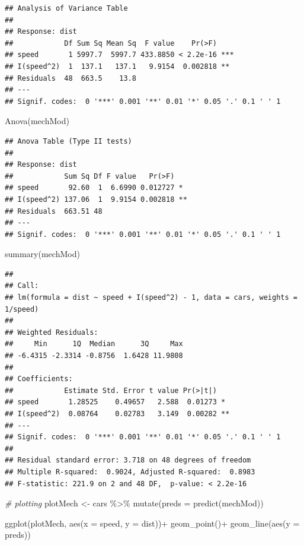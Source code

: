 \documentclass[
]{book}
\newenvironment{Shaded}{\begin{snugshade}}{\end{snugshade}}
\newcommand{\AttributeTok}[1]{\textcolor[rgb]{0.77,0.63,0.00}{#1}}
\newcommand{\CommentTok}[1]{\textcolor[rgb]{0.56,0.35,0.01}{\textit{#1}}}
\newcommand{\FunctionTok}[1]{\textcolor[rgb]{0.00,0.00,0.00}{#1}}
\newcommand{\NormalTok}[1]{#1}
\newcommand{\OtherTok}[1]{\textcolor[rgb]{0.56,0.35,0.01}{#1}}
\newcommand{\SpecialCharTok}[1]{\textcolor[rgb]{0.00,0.00,0.00}{#1}}
\begin{document}
\begin{verbatim}
## Analysis of Variance Table
## 
## Response: dist
##            Df Sum Sq Mean Sq  F value    Pr(>F)    
## speed       1 5997.7  5997.7 433.8850 < 2.2e-16 ***
## I(speed^2)  1  137.1   137.1   9.9154  0.002818 ** 
## Residuals  48  663.5    13.8                       
## ---
## Signif. codes:  0 '***' 0.001 '**' 0.01 '*' 0.05 '.' 0.1 ' ' 1
\end{verbatim}

\begin{Shaded}
\begin{Highlighting}[]
\FunctionTok{Anova}\NormalTok{(mechMod)}
\end{Highlighting}
\end{Shaded}

\begin{verbatim}
## Anova Table (Type II tests)
## 
## Response: dist
##            Sum Sq Df F value   Pr(>F)   
## speed       92.60  1  6.6990 0.012727 * 
## I(speed^2) 137.06  1  9.9154 0.002818 **
## Residuals  663.51 48                    
## ---
## Signif. codes:  0 '***' 0.001 '**' 0.01 '*' 0.05 '.' 0.1 ' ' 1
\end{verbatim}

\begin{Shaded}
\begin{Highlighting}[]
\FunctionTok{summary}\NormalTok{(mechMod)}
\end{Highlighting}
\end{Shaded}

\begin{verbatim}
## 
## Call:
## lm(formula = dist ~ speed + I(speed^2) - 1, data = cars, weights = 1/speed)
## 
## Weighted Residuals:
##     Min      1Q  Median      3Q     Max 
## -6.4315 -2.3314 -0.8756  1.6428 11.9808 
## 
## Coefficients:
##            Estimate Std. Error t value Pr(>|t|)   
## speed       1.28525    0.49657   2.588  0.01273 * 
## I(speed^2)  0.08764    0.02783   3.149  0.00282 **
## ---
## Signif. codes:  0 '***' 0.001 '**' 0.01 '*' 0.05 '.' 0.1 ' ' 1
## 
## Residual standard error: 3.718 on 48 degrees of freedom
## Multiple R-squared:  0.9024, Adjusted R-squared:  0.8983 
## F-statistic: 221.9 on 2 and 48 DF,  p-value: < 2.2e-16
\end{verbatim}

\begin{Shaded}
\begin{Highlighting}[]
\CommentTok{\# plotting}
\NormalTok{plotMech }\OtherTok{\textless{}{-}}\NormalTok{ cars }\SpecialCharTok{\%\textgreater{}\%} 
  \FunctionTok{mutate}\NormalTok{(}\AttributeTok{preds =} \FunctionTok{predict}\NormalTok{(mechMod))}

\FunctionTok{ggplot}\NormalTok{(plotMech, }\FunctionTok{aes}\NormalTok{(}\AttributeTok{x =}\NormalTok{ speed, }\AttributeTok{y =}\NormalTok{ dist))}\SpecialCharTok{+}
  \FunctionTok{geom\_point}\NormalTok{()}\SpecialCharTok{+}
  \FunctionTok{geom\_line}\NormalTok{(}\FunctionTok{aes}\NormalTok{(}\AttributeTok{y =}\NormalTok{ preds))}
\end{Highlighting}
\end{Shaded}
\end{document}
